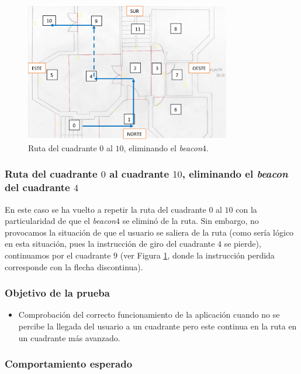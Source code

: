 \begin{figure}[t]
	\centering
	\includegraphics[width=0.8\textwidth]{Imagenes/Evaluacion/del0al10sin4}
	\caption{Ruta del cuadrante $0$ al $10$, eliminando el \textit{beacon$4$}.}
	\label{fig:del0al10sin4}
\end{figure}

\subsubsection{Ruta del cuadrante $0$ al cuadrante $10$, eliminando el \textit{beacon} del cuadrante $4$}
\label{subsub:0al10sin4}

En este caso se ha vuelto a repetir la ruta del cuadrante $0$ al $10$ con la particularidad de que el \textit{beacon$4$} se eliminó de la ruta. Sin embargo, no provocamos la situación de que el usuario se saliera de la ruta (como sería lógico en esta situación, pues la instrucción de giro del cuadrante $4$ se pierde), continuamos por el cuadrante $9$ (ver Figura \ref{fig:del0al10sin4}, donde la instrucción perdida corresponde con la flecha discontinua). 

\subsubsection*{Objetivo de la prueba}

\begin{itemize}
	\item Comprobación del correcto funcionamiento de la aplicación cuando no se percibe la llegada del usuario a un cuadrante pero este continua en la ruta en un cuadrante más avanzado.
\end{itemize}


\subsubsection*{Comportamiento esperado}

